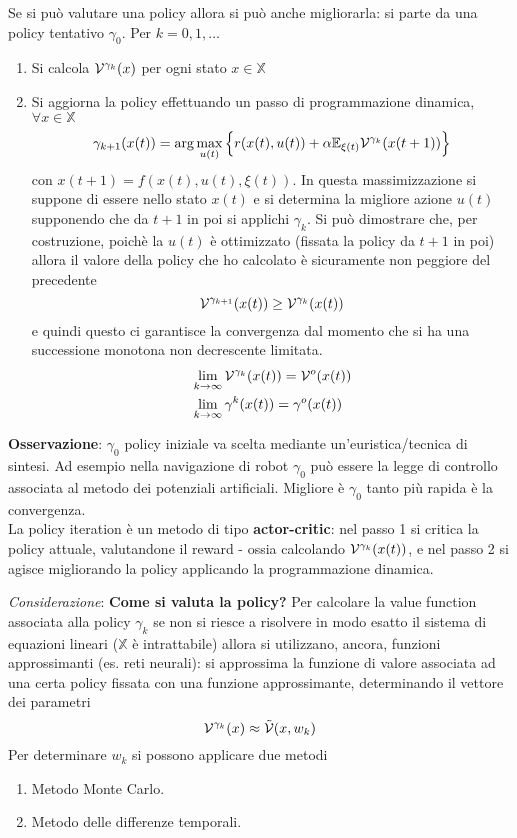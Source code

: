 Se si pu\`o valutare una policy allora si pu\`o anche migliorarla: si parte da una policy tentativo $\gamma_0$. 
Per $k=0,1,\dots$
\begin{enumerate}
 \item Si calcola $\mathcal{V}^{\gamma_k}(x)$ per ogni stato $x \in \mathbb{X}$
 \item Si aggiorna la policy effettuando un passo di programmazione dinamica, $\forall x \in \mathbb{X}$
    \begin{equation}
    \gamma_{k+1}(x(t)) = \arg \max_{u(t)} \Big \{ r(x(t), u(t)) + \alpha \mathbb{E}_{\xi(t)} \mathcal{V}^{\gamma_k}(x(t+1)) \Big \}
    \end{equation} con $x(t+1) = f(x(t),u(t),\xi(t))$. In questa massimizzazione si suppone di essere nello stato $x(t)$ e si determina la migliore azione $u(t)$ supponendo che da $t+1$ in poi si applichi $\gamma_k$. Si pu\`o dimostrare che, per costruzione, poich\`e la $u(t)$ \`e ottimizzato (fissata la policy da $t+1$ in poi) allora il valore della policy che ho calcolato \`e sicuramente non peggiore del precedente
    \begin{equation}
    \mathcal{V}^{\gamma_{k+1}} (x(t)) \geq \mathcal{V}^{\gamma_k} (x(t))
    \end{equation} e quindi questo ci garantisce la convergenza dal momento che si ha una successione monotona non decrescente limitata.
    \begin{align}
    &\lim_{k \to \infty} \mathcal{V}^{\gamma_k} (x(t)) = \mathcal{V}^o(x(t)) \\
    &\lim_{k \to \infty} \gamma^k(x(t)) = \gamma^o(x(t))
    \end{align}
\end{enumerate}
\textbf{Osservazione}: $\gamma_0$ policy iniziale va scelta mediante un'euristica/tecnica di sintesi. Ad esempio nella navigazione di robot $\gamma_0$ pu\`o essere la legge di controllo associata al metodo dei potenziali artificiali.
Migliore \`e $\gamma_0$ tanto pi\`u rapida \`e la convergenza.\\
La policy iteration \`e un metodo di tipo \textbf{actor-critic}: nel passo 1 si critica la policy attuale, valutandone il reward - ossia calcolando $\mathcal{V}^{\gamma_k} (x(t))$, e nel passo 2 si agisce migliorando la policy applicando la programmazione dinamica.

\textit{Considerazione}: \textbf{Come si valuta la policy?} Per calcolare la value function associata alla policy $\gamma_k$ se non si riesce a risolvere in modo esatto il sistema di equazioni lineari ($\mathbb{X}$ \`e intrattabile) allora si utilizzano, ancora, funzioni approssimanti (es. reti neurali): si approssima la funzione di valore associata ad una certa policy fissata con una funzione approssimante, determinando il vettore dei parametri
\begin{equation}
\mathcal{V}^{\gamma_k}(x) \approx \tilde{\mathcal{V}}(x,w_k)
\end{equation} Per determinare $w_k$ si possono applicare due metodi
\begin{enumerate}
\item Metodo Monte Carlo.
\item Metodo delle differenze temporali.
\end{enumerate}

